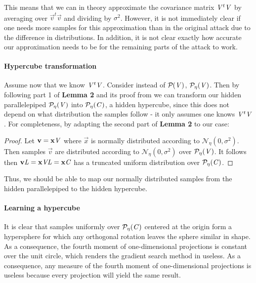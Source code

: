This means that we can in theory approximate the covariance matrix $\mat{V}^t \mat{V}$ by averaging over $\vec{v}^t \vec{v}$ and dividing by $\sigma ^2$. 
However, it is not immediately clear if one needs more samples for this approximation than in the original attack due to the difference in distributions.
In addition, it is not clear exactly how accurate our approximation needs to be for the remaining parts of the attack to work. 

\paragraph{Hypercube transformation}
Assume now that we know $\mat{V}^t \mat{V}$. Consider instead of $\PP{V}$, $\PP[\eta]{V}$.
Then by following part 1 of \textbf{Lemma 2} and its proof from \cite{NR09} we can transform our hidden parallelepiped $\PP[\eta]{V}$ into $\PP[\eta]{C}$, a hidden hypercube,
since this does not depend on what distribution the samples follow - it only assumes one knows $\mat{V}^t\mat{V}$.
For completeness, by adapting the second part of \textbf{Lemma 2} to our case: 
\begin{proof}
    Let $\vec{v} = \vec{x}\mat{V}$ where $\vec{x}$ is normally distributed according to $\mathcal{N}_{\eta}(0, \sigma^2)$.
    Then samples $\vec{v}$ are distributed according to $\mathcal{N}_{\eta}(0, \sigma^2)$ over $\PP[\eta]{V}$.
    It follows then $\vec{v}\mat{L} = \vec{x}\mat{V}\mat{L} = \vec{x}\mat{C}$ has a truncated uniform distribution over $\PP[\eta]{C}$.
\end{proof}
Thus, we should be able to map our normally distributed samples from the hidden parallelepiped to the hidden hypercube.

\paragraph{Learning a hypercube}
It is clear that samples uniformly over $\PP[\eta]{C}$ centered at the origin form a hypersphere for which any orthogonal rotation leaves the sphere similar in shape. 
As a consequence, the fourth moment of one-dimensional projections is constant over the unit circle, which renders the gradient search method in \cite{NR09} useless.
As a consequence, any measure of the fourth moment of one-dimensional projections is useless because every projection will yield the same result.

